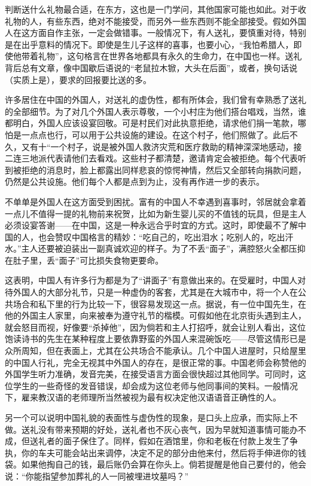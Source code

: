 \documentclass[12pt,oneside]{book}
\begin{document}
\begin{common-format}
判断送什么礼物最合适，在东方，这也是一门学问，其他国家可能也如此。对于收礼物的人，有些东西，绝对不能接受，而另外一些东西则不能全部接受。假如外国人在这方面自作主张，一定会做错事。一般情况下，有人送礼，要慎重对待，特别是在出乎意料的情况下。即使是生儿子这样的喜事，也要小心，“我怕希腊人，即使他带着礼物”，这句格言在世界各地都具有永久的生命力，在中国也一样。送礼背后总有文章，像中国歇后语说的“老鼠拉木锨，大头在后面”，或者，换句话说（实质上是），要求的回报要比送的多。 

许多居住在中国的外国人，对送礼的虚伪性，都有所体会，我们曾有幸熟悉了送礼的全部细节。为了对几个外国人表示尊敬，一个小村庄为他们搭台唱戏，当然，谁都明白，外国人应该设宴回敬。可是村民们对此执意拒绝，请求他们捐一笔款，哪怕是一点点也行，可以用于公共设施的建设。在这个村子，他们照做了。此后不久，又有十“一个村子，说是被外国人救济灾荒和医疗救助的精神深深地感动，接二连三地派代表请他们去看戏。这些村子都清楚，邀请肯定会被拒绝。每个代表听到被拒绝的消息时，脸上都露出同样悲哀的惊愕神情，然后又全部转向捐款问题，仍然是公共设施。他们每个人都是点到为止，没有再作进一步的表示。 

不单单是外国人在这方面受到困扰。富有的中国人不幸遇到喜事时，邻居就会拿着一点儿不值得一提的礼物前来祝贺，比如为新生婴儿买的不值钱的玩具，但是主人必须设宴答谢——在中国，这是一种永远合乎时宜的方式。这时，即使最不了解中国的人，也会赞叹中国格言的精妙：“吃自己的，吃出泪水；吃别人的，吃出汗水。”主人还要被迫装出一副真诚欢迎的样子。为了不丢“面子”，满腔怒火全都压抑在肚子里，丢“面子”可比损失食物更要命。 

这表明，中国人有许多行为都是为了“讲面子”有意做出来的。在受雇时，中国人对待外国人的大部分礼节，只是一种虚伪的客套，尤其是在大城市中，将一个人在公共场合和私下里的行为比较一下，很容易发现这一点。据说，有一位中国先生，在他的外国主人家里，向来被奉为遵守礼节的楷模。可假如他在北京街头遇到主人，就会怒目而视，好像要“杀掉他”，因为倘若和主人打招呼，就会让别人看出，这位饱读诗书的先生在某种程度上要依靠野蛮的外国人来混碗饭吃——尽管这情形已是众所周知，但在表面上，尤其在公共场合不能承认。几个中国人进屋时，只给屋里的中国人行礼，完全无视其中外国人的存在，是很正常的事。中国老师会称赞他的外国学生听力准确，发音完美，在接受语言方面会很快超过其他同学。可同时，这位学生的一些奇怪的发音错误，却会成为这位老师与他同事间的笑料。一般情况下，雇来教汉语的老师理所当然被视为最有权决定他汉语语音正确性的人。 

另一个可以说明中国礼貌的表面性与虚伪性的现象，是口头上应承，而实际上不做。送礼没有带来预期的好处，送礼者也不灰心丧气，因为早就知道事情可能办不成，但送礼者的面子保住了。同样，假如在酒馆里，你和老板在付款上发生了争执，你的车夫可能会站出来调停，决定不足的部分由他来付，然后将手伸进你的钱袋。如果他掏自己的钱，最后账仍会算在你头上。倘若提醒是他自己要付的，他会说：“你能指望参加葬礼的人一同被埋进坟墓吗？” 


\end{common-format}
\end{document}
